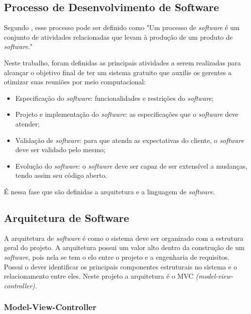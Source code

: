 \subsection{Processo de Desenvolvimento de Software}

Segundo \cite{sommerville}, esse processo pode ser definido como "Um processo de \textit{software} é um conjunto de atividades relacionadas que levam à produção de um produto de \textit{software}."

Neste trabalho, foram definidas as principais atividades a serem realizadas para alcançar o objetivo final de ter um sistema gratuito que auxilie os gerentes a otimizar suas reuniões por meio computacional:

\begin{itemize}
    \item Especificação do \textit{software}: funcionalidades e restrições do \textit{software};
    \item Projeto e implementação do \textit{software}: as especificações que o \textit{software} deve atender;
    \item Validação de \textit{software}: para que atenda as expectativas do cliente, o \textit{software} deve ser validado pelo mesmo;
    \item Evolução do \textit{software}: o \textit{software} deve ser capaz de ser extensível a mudanças, tendo assim seu código aberto.    
\end{itemize}

É nessa fase que são definidas a arquitetura e a linguagem de \textit{software}.

\subsection{Arquitetura de Software}

A arquitetura de \textit{software} é como o sistema deve ser organizado com a estrutura geral do projeto. A arquitetura possui um valor alto dentro da construção de um \textit{software}, pois nela se tem o elo entre o projeto e a engenharia de requisitos. Possui o dever identificar os principais componentes estruturais no sistema e o relacionamento entre eles. Neste projeto a arquitetura é o MVC \textit{(model-view-controller)}.

\subsubsection{Model-View-Controller}
\label{sec:mvc}

